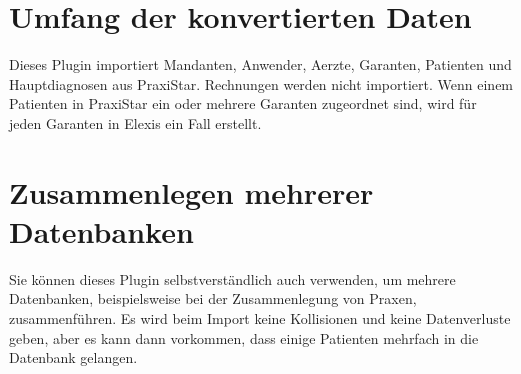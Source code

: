\documentclass[a4paper]{scrartcl}
\begin{document}
\section{Umfang der konvertierten Daten}
Dieses Plugin importiert Mandanten, Anwender, Aerzte, Garanten, Patienten und Hauptdiagnosen aus PraxiStar. Rechnungen werden nicht importiert.
Wenn einem Patienten in PraxiStar ein oder mehrere Garanten zugeordnet sind, wird für jeden Garanten in Elexis ein Fall erstellt.

\section{Zusammenlegen mehrerer Datenbanken}
Sie können dieses Plugin selbstverständlich auch verwenden, um mehrere Datenbanken, beispielsweise bei der Zusammenlegung von Praxen, zusammenführen. Es wird beim Import keine Kollisionen und keine Datenverluste geben, aber es kann dann vorkommen, dass einige Patienten mehrfach in die Datenbank gelangen. 
\end{document}
